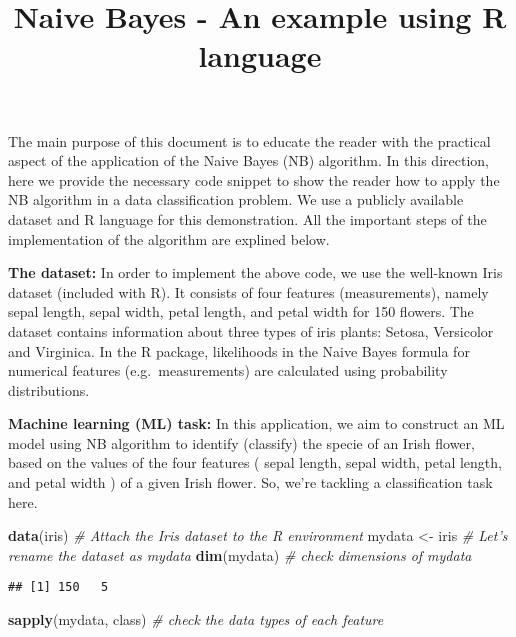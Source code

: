\documentclass[]{article}
\title{Naive Bayes - An example using R language}
\author{}
\date{}
\newenvironment{Shaded}{\begin{snugshade}}{\end{snugshade}}
\newcommand{\CommentTok}[1]{\textcolor[rgb]{0.56,0.35,0.01}{\textit{#1}}}
\newcommand{\KeywordTok}[1]{\textcolor[rgb]{0.13,0.29,0.53}{\textbf{#1}}}
\newcommand{\NormalTok}[1]{#1}
\newcommand{\StringTok}[1]{\textcolor[rgb]{0.31,0.60,0.02}{#1}}
\begin{document}
\maketitle

The main purpose of this document is to educate the reader with the
practical aspect of the application of the Naive Bayes (NB) algorithm.
In this direction, here we provide the necessary code snippet to show
the reader how to apply the NB algorithm in a data classification
problem. We use a publicly available dataset and R language for this
demonstration. All the important steps of the implementation of the
algorithm are explined below.

\textbf{The dataset:} In order to implement the above code, we use the
well-known Iris dataset (included with R). It consists of four features
(measurements), namely sepal length, sepal width, petal length, and
petal width for 150 ﬂowers. The dataset contains information about three
types of iris plants: Setosa, Versicolor and Virginica. In the R
package, likelihoods in the Naive Bayes formula for numerical features
(e.g.~measurements) are calculated using probability distributions.

\textbf{Machine learning (ML) task:} In this application, we aim to
construct an ML model using NB algorithm to identify (classify) the
specie of an Irish flower, based on the values of the four features (
sepal length, sepal width, petal length, and petal width ) of a given
Irish flower. So, we're tackling a classification task here.

\begin{Shaded}
\begin{Highlighting}[]
\KeywordTok{data}\NormalTok{(iris) }\CommentTok{# Attach the Iris dataset to the R environment}
\NormalTok{mydata <-}\StringTok{ }\NormalTok{iris }\CommentTok{# Let's rename the dataset as mydata}
\KeywordTok{dim}\NormalTok{(mydata) }\CommentTok{# check dimensions of mydata}
\end{Highlighting}
\end{Shaded}

\begin{verbatim}
## [1] 150   5
\end{verbatim}

\begin{Shaded}
\begin{Highlighting}[]
\KeywordTok{sapply}\NormalTok{(mydata, class) }\CommentTok{# check the data types of each feature}
\end{Highlighting}
\end{Shaded}
\end{document}
